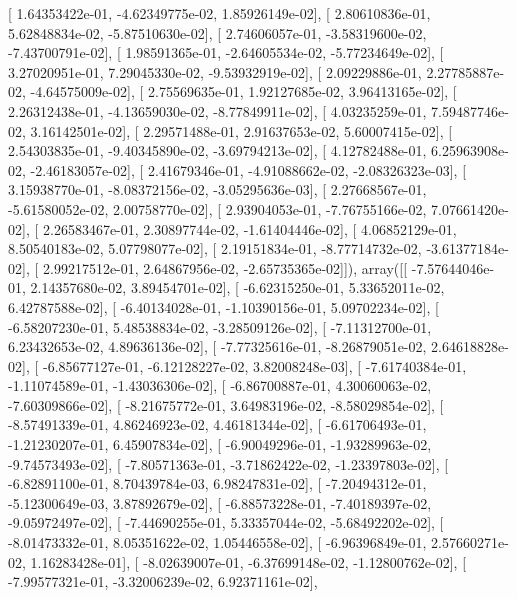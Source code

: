 \documentclass{article}
\begin{document}
       [  1.64353422e-01,  -4.62349775e-02,   1.85926149e-02],
       [  2.80610836e-01,   5.62848834e-02,  -5.87510630e-02],
       [  2.74606057e-01,  -3.58319600e-02,  -7.43700791e-02],
       [  1.98591365e-01,  -2.64605534e-02,  -5.77234649e-02],
       [  3.27020951e-01,   7.29045330e-02,  -9.53932919e-02],
       [  2.09229886e-01,   2.27785887e-02,  -4.64575009e-02],
       [  2.75569635e-01,   1.92127685e-02,   3.96413165e-02],
       [  2.26312438e-01,  -4.13659030e-02,  -8.77849911e-02],
       [  4.03235259e-01,   7.59487746e-02,   3.16142501e-02],
       [  2.29571488e-01,   2.91637653e-02,   5.60007415e-02],
       [  2.54303835e-01,  -9.40345890e-02,  -3.69794213e-02],
       [  4.12782488e-01,   6.25963908e-02,  -2.46183057e-02],
       [  2.41679346e-01,  -4.91088662e-02,  -2.08326323e-03],
       [  3.15938770e-01,  -8.08372156e-02,  -3.05295636e-03],
       [  2.27668567e-01,  -5.61580052e-02,   2.00758770e-02],
       [  2.93904053e-01,  -7.76755166e-02,   7.07661420e-02],
       [  2.26583467e-01,   2.30897744e-02,  -1.61404446e-02],
       [  4.06852129e-01,   8.50540183e-02,   5.07798077e-02],
       [  2.19151834e-01,  -8.77714732e-02,  -3.61377184e-02],
       [  2.99217512e-01,   2.64867956e-02,  -2.65735365e-02]]), array([[ -7.57644046e-01,   2.14357680e-02,   3.89454701e-02],
       [ -6.62315250e-01,   5.33652011e-02,   6.42787588e-02],
       [ -6.40134028e-01,  -1.10390156e-01,   5.09702234e-02],
       [ -6.58207230e-01,   5.48538834e-02,  -3.28509126e-02],
       [ -7.11312700e-01,   6.23432653e-02,   4.89636136e-02],
       [ -7.77325616e-01,  -8.26879051e-02,   2.64618828e-02],
       [ -6.85677127e-01,  -6.12128227e-02,   3.82008248e-03],
       [ -7.61740384e-01,  -1.11074589e-01,  -1.43036306e-02],
       [ -6.86700887e-01,   4.30060063e-02,  -7.60309866e-02],
       [ -8.21675772e-01,   3.64983196e-02,  -8.58029854e-02],
       [ -8.57491339e-01,   4.86246923e-02,   4.46181344e-02],
       [ -6.61706493e-01,  -1.21230207e-01,   6.45907834e-02],
       [ -6.90049296e-01,  -1.93289963e-02,  -9.74573493e-02],
       [ -7.80571363e-01,  -3.71862422e-02,  -1.23397803e-02],
       [ -6.82891100e-01,   8.70439784e-03,   6.98247831e-02],
       [ -7.20494312e-01,  -5.12300649e-03,   3.87892679e-02],
       [ -6.88573228e-01,  -7.40189397e-02,  -9.05972497e-02],
       [ -7.44690255e-01,   5.33357044e-02,  -5.68492202e-02],
       [ -8.01473332e-01,   8.05351622e-02,   1.05446558e-02],
       [ -6.96396849e-01,   2.57660271e-02,   1.16283428e-01],
       [ -8.02639007e-01,  -6.37699148e-02,  -1.12800762e-02],
       [ -7.99577321e-01,  -3.32006239e-02,   6.92371161e-02],
\end{document}
